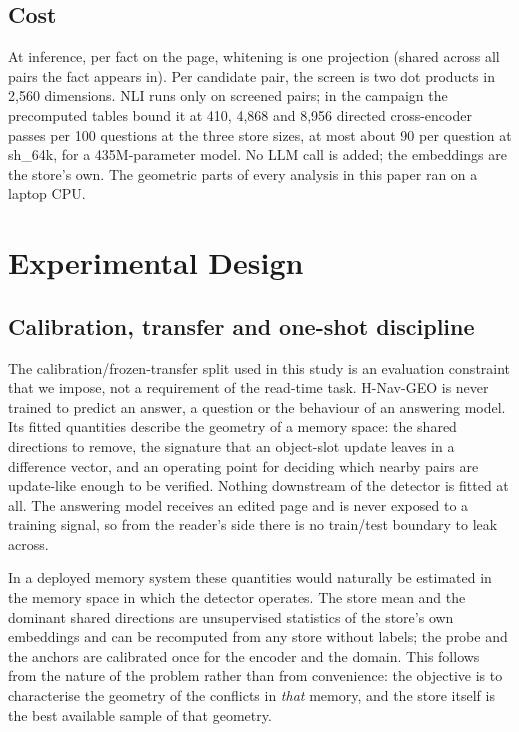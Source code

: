 \documentclass[journal=jcisd8,manuscript=article]{achemso}
\begin{document}
\subsection{Cost}
\label{sec:cost}

At inference, per fact on the page, whitening is one projection (shared across all pairs the fact appears in). Per candidate pair, the screen is two dot products in 2,560 dimensions. NLI runs only on screened pairs; in the campaign the precomputed tables bound it at 410, 4,868 and 8,956 directed cross-encoder passes per 100 questions at the three store sizes, at most about 90 per question at sh\_64k, for a 435M-parameter model. No LLM call is added; the embeddings are the store's own. The geometric parts of every analysis in this paper ran on a laptop CPU.

\section{Experimental Design}
\label{sec:design}

\subsection{Calibration, transfer and one-shot discipline}
\label{sec:splits}

The calibration/frozen-transfer split used in this study is an evaluation constraint that we impose, not a requirement of the read-time task. H-Nav-GEO is never trained to predict an answer, a question or the behaviour of an answering model. Its fitted quantities describe the geometry of a memory space: the shared directions to remove, the signature that an object-slot update leaves in a difference vector, and an operating point for deciding which nearby pairs are update-like enough to be verified. Nothing downstream of the detector is fitted at all. The answering model receives an edited page and is never exposed to a training signal, so from the reader's side there is no train/test boundary to leak across.

In a deployed memory system these quantities would naturally be estimated in the memory space in which the detector operates. The store mean and the dominant shared directions are unsupervised statistics of the store's own embeddings and can be recomputed from any store without labels; the probe and the anchors are calibrated once for the encoder and the domain. This follows from the nature of the problem rather than from convenience: the objective is to characterise the geometry of the conflicts in \emph{that} memory, and the store itself is the best available sample of that geometry.
\end{document}
